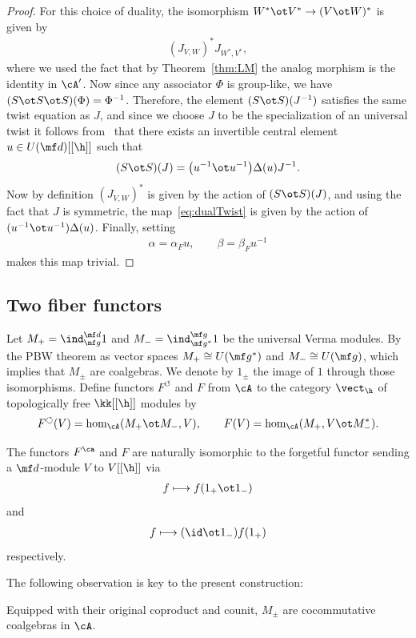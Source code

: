 \begin{proof}
For this choice of duality, the isomorphism $W^* \ot V^*\rightarrow (V\ot W)^* $ is given by
\begin{gather}\label{eq:dualTwist}
	(J_{V,W})^*J_{W^*,V^*},
\end{gather}
where we used the fact that by Theorem~\ref{thm:LM} the analog morphism is the identity in $\cA'$. Now since any associator $\Phi$ is group-like, we have $(S\ot S\ot S)(\Phi)=\Phi^{-1}$. Therefore, the element $(S \ot S)(J^{-1})$ satisf\/ies the same twist equation as $J$, and since we choose $J$ to be the specialization of an universal twist it follows from~\cite{Drinfeld1990a} that there exists an invertible central element $u \in U(\mf d)[[\h]]$ such that
\begin{gather*}
	(S\ot S)(J)=\big(u^{-1}\ot u^{-1}\big)\Delta(u)J^{-1}.
\end{gather*}
Now by def\/inition $(J_{V,W})^*$ is given by the action of $(S\ot S)(J)$, and using the fact that $J$ is symmetric, the map~\eqref{eq:dualTwist} is given by the action of $(u^{-1}\ot u^{-1})\Delta(u)$. Finally, setting
\begin{gather*}
	\alpha =\alpha_F u,\qquad \beta =\beta_Fu^{-1}
\end{gather*}
makes this map trivial.
\end{proof}

\subsection{Two f\/iber functors}

Let $M_+=\ind_{\mf g}^{\mf d} 1$ and $M_-=\ind_{\mf g^*}^{\mf g} 1$ be the universal Verma modules. By the PBW theorem as vector spaces $M_+\cong U(\mf g^*)$ and $M_-\cong U(\mf g)$, which implies that $M_{\pm}$ are coalgebras. We denote by $1_\pm$ the image of $1$ through those isomorphisms. Def\/ine functors $F^{\circlearrowleft}$ and $F$ from $\cA$ to the category $\vect_\h$ of topologically free $\kk[[\h]]$ modules by
\begin{gather*}
	F^{\circlearrowleft}(V) =\hom_\cA(M_+ \ot M_-, V), \qquad 	F(V) =\hom_\cA(M_+, V\ot M_-^*).
\end{gather*}
\begin{prop}
	The functors $F^\ca$ and $F$ are naturally isomorphic to the forgetful functor sending a $\mf d$-module $V$ to $V[[\h]]$ via
	\begin{gather*}
		f\longmapsto f(1_+ \ot 1_-)
	\end{gather*}
	and
	\begin{gather*}
		f \longmapsto (\id\ot 1_-)f(1_+)
	\end{gather*}
	respectively.

\end{prop}
The following observation is key to the present construction:
\begin{prop}\label{prop:coalg}
Equipped with their original coproduct and counit, $M_\pm$ are cocommutative coalgebras in $\cA$.
\end{prop}

